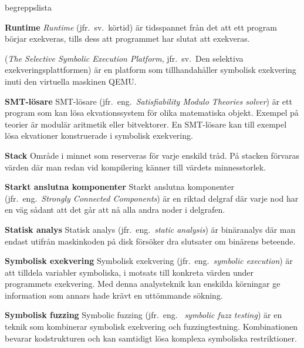 \begin{labeling}{begreppslista}
    \item [\textbf{Runtime}] \emph{Runtime} (jfr.\ sv.\ körtid) är tidsspannet
    från det att ett program börjar exekveras, tills dess att programmet har
    slutat att exekveras.

    \item [\textbf{\stoe}] \stoe (\emph{The Selective Symbolic Execution
        Platform}, jfr.\ sv.\ Den selektiva exekveringsplattformen) är
    en platform som tillhandahåller symbolisk exekvering inuti den virtuella
    maskinen QEMU.\@

    \item [\textbf{SMT-lösare}] SMT-lösare (jfr.\ eng.\ \emph{Satisfiability Modulo
        Theories solver}) är ett program som kan lösa
    ekvationssystem för olika matematiska objekt. Exempel på
    teorier är modulär aritmetik eller bitvektorer. En SMT-lösare
    kan till exempel lösa ekvationer konstruerade i symbolisk
    exekvering.

    \item [\textbf{Stack}] Område i minnet som reserveras för varje
    enskild tråd. På stacken förvaras värden där man redan vid
    kompilering känner till värdets minnesstorlek.

    \item [\textbf{Starkt anslutna komponenter}] Starkt anslutna komponenter
    (jfr.\ eng.\ \emph{Strongly Connected Components}) är en riktad delgraf där
    varje nod har en väg sådant att det går att nå alla andra noder i delgrafen.

    \item [\textbf{Statisk analys}] Statisk analys (jfr.\ eng.\ \emph{static
        analysis}) är binäranalys där man endast utifrån maskinkoden på disk
    försöker dra slutsater om binärens beteende.


    \item [\textbf{Symbolisk exekvering}] Symbolisk exekvering (jfr.\ eng.\
    \emph{symbolic execution}) är att tilldela variabler symboliska, i motsats
    till konkreta värden under programmets exekvering. Med denna analysteknik
    kan enskilda körningar ge information som annars hade krävt en uttömmande
    sökning.

    \item [\textbf{Symbolisk fuzzing}] Symbolic fuzzing (jfr.\ eng.
    \ \emph{symbolic fuzz testing}) är en teknik som kombinerar symbolisk
    exekvering och fuzzingtestning. Kombinationen bevarar kodstrukturen och kan
    samtidigt lösa komplexa symboliska restriktioner.


\end{labeling}
